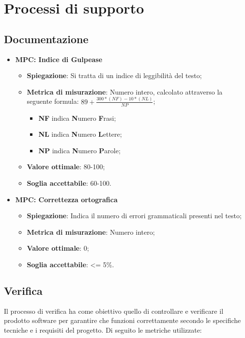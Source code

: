 \section{Processi di supporto}


\subsection{Documentazione}
\begin{itemize}
    \item \textbf{MPC: Indice di Gulpease}
    \begin{itemize}
        \item \textbf{Spiegazione}: Si tratta di un indice di leggibilità del testo;
        \item \textbf{Metrica di misurazione}: Numero intero, calcolato attraverso la seguente formula: \textbf{$89 + \frac{300*(NF)-10*(NL)}{NP}$};
            \begin{itemize}
                \item \textbf{NF} indica \textbf{N}umero \textbf{F}rasi;
                \item \textbf{NL} indica \textbf{N}umero \textbf{L}ettere;
                \item \textbf{NP} indica \textbf{N}umero \textbf{P}arole;
            \end{itemize}
        \item \textbf{Valore ottimale}: 80-100;
        \item \textbf{Soglia accettabile}: 60-100.
    \end{itemize}
\end{itemize}

\begin{itemize}
    \item \textbf{MPC: Correttezza ortografica}
    \begin{itemize}
        \item \textbf{Spiegazione}: Indica il numero di errori grammaticali presenti nel testo;
        \item \textbf{Metrica di misurazione}: Numero intero;
        \item \textbf{Valore ottimale}: 0;
        \item \textbf{Soglia accettabile}: <= 5\%.
    \end{itemize}
\end{itemize}

\subsection{Verifica}
Il processo di verifica ha come obiettivo quello di controllare e verificare il prodotto software per garantire che funzioni correttamente secondo le specifiche tecniche e i requisiti del progetto. Di seguito le metriche utilizzate:

